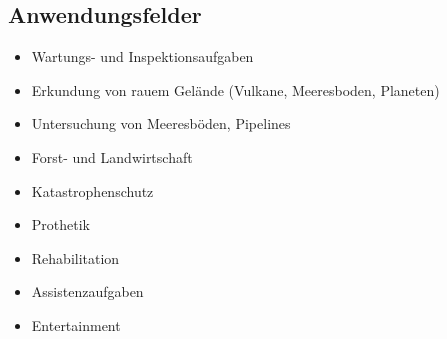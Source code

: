 \subsection{Anwendungsfelder}
\begin{itemize}
	\item Wartungs- und Inspektionsaufgaben
	\item Erkundung von rauem Gelände (Vulkane, Meeresboden, Planeten)
	\item Untersuchung von Meeresböden, Pipelines
	\item Forst- und Landwirtschaft
	\item Katastrophenschutz
	\item Prothetik
	\item Rehabilitation
	\item Assistenzaufgaben
	\item Entertainment
\end{itemize}
\newpage